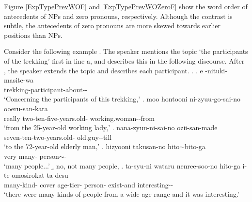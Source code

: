 Figure \ref{ExpTypePrevWOF} and \ref{ExpTypePrevWOZeroF} show the word order of antecedents of NPs and zero pronouns, respectively.
Although the contrast is subtle,
the antecedents of zero pronouns are more skewed towards earlier positions than NPs.

Consider the following example \Next.
The speaker mentions the topic `the participants of the trekking' first in line a,
and describes this in the following discourse.
After \Next[f],
the speaker extends the topic and describes each participant.
%
\ex.\label{trekking}
 \ag. e -nituki-masite-wa \\
 	 trekking-participant-about-- \\
	`Concerning the participants of this trekking,'
 \bg. moo hontooni ni-zyuu-go-sai-no ooeru-san-kara \\
 	 really two-ten-five-years.old- working.woman--from \\
	`from the 25-year-old working lady,'
 \bg. nana-zyuu-ni-sai-no ozii-san-made \\
 	seven-ten-two-years.old- old.guy--till \\
	`to the 72-year-old elderly man,'
 \bg. hizyooni takusan-no hito$\sim$bito-ga \\
 	very many- person$\sim$- \\
	`many people...'
 \b. no, not many people,
 \bg. ta-syu-ni wataru nenree-soo-no hito-ga i-te omosirokat-ta-desu \\
 		many-kind- cover age-tier- person- exist-and interesting-- \\
		`there were many kinds of people from a wide age range and it was interesting.'

